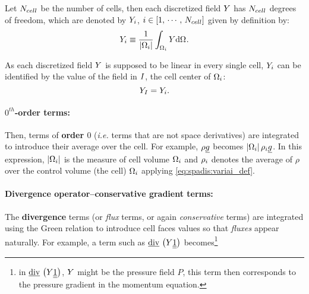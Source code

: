 Let $\ncell$ be the number of cells, then each discretized field $\varia$ has $\ncell$ degrees of freedom,
which are denoted by $\varia_\celli$, $\celli \in \left[ 1 , \, \cdots , \, \ncell \right]$ given by definition by:
\begin{equation}\label{eq:spadis:variai_def}
\varia_\celli \equiv \dfrac{1}{\norm{\vol{\celli}}}\int_{\vol{\celli}} \varia \dd \vol{}.
\end{equation}

As each discretized field $\varia$ is supposed to be linear in every single cell, $\varia_\celli$ can be identified
by the value of the field in $\centi$, the cell center of $\vol{\celli}$:
\begin{equation}\label{eq:spadis:variai_id}
\varia_\centi = \varia_\celli.
\end{equation}

\paragraph{$0^{th}$-order terms:}
Then, terms of \textbf{order $0$} (\emph{i.e.} terms that are not space
derivatives) are integrated to introduce their average over the cell. For
example, $\rho \vect{g}$ becomes $\norm{\vol{\celli}} \rho_{\celli} \vect{g}$.
In this expression, $\norm{\vol{\celli}}$ is the measure of cell volume $\vol{\celli}$ and
$\rho_{\celli}$ denotes the average of $\rho $ over the control volume
(the cell) $\vol{\celli}$ applying \eqref{eq:spadis:variai_def}.

\paragraph{Divergence operator--conservative gradient terms:}
The \textbf{divergence} terms (or \emph{flux} terms, or again \emph{conservative}
terms) are integrated using the Green relation to introduce cell faces
values so that \emph{fluxes} appear naturally. For example, a term such as
$\divv \left( \varia \tens{1}\right)$ becomes\footnote{%
in $\divv \left( \varia \tens{1}\right)$, $\varia$ might be the pressure field $P$, this term then corresponds to the pressure gradient
in the momentum equation.
}%


